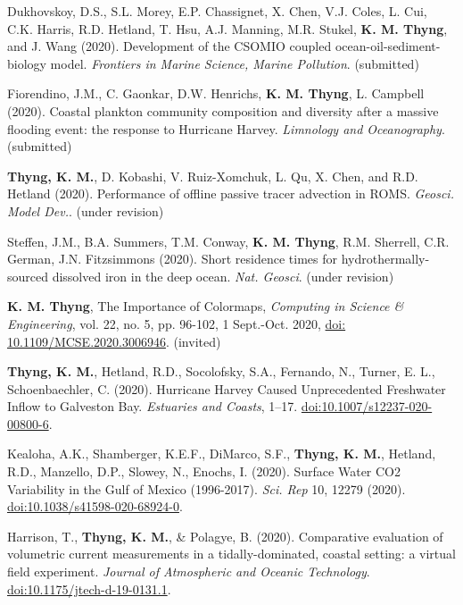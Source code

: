 \documentclass[10pt,letterpaper]{article}
\newcommand{\kmt}{\textbf{K. M. Thyng}}
\newcommand{\tkm}{\textbf{Thyng, K. M.}}
\renewenvironment{itemize}{
  \begin{list}{}{
    \setlength{\leftmargin}{1.5em}
    \setlength{\itemsep}{0.25em}
    \setlength{\parskip}{0pt}
    \setlength{\parsep}{0.25em}
  }
}{
  \end{list}
}
\begin{document}
\begin{itemize}

\item Dukhovskoy, D.S., S.L. Morey, E.P. Chassignet, X. Chen, V.J. Coles, L. Cui, C.K. Harris, R.D. Hetland, T. Hsu, A.J. Manning, M.R. Stukel, \kmt, and J. Wang (2020). Development of the CSOMIO coupled ocean-oil-sediment-biology model. \textit{Frontiers in Marine Science, Marine Pollution}. (submitted)

\item Fiorendino, J.M., C. Gaonkar, D.W. Henrichs, \kmt, L. Campbell (2020). Coastal plankton community composition and diversity after a massive flooding event: the response to Hurricane Harvey. \textit{Limnology and Oceanography}. (submitted)

\item \tkm, D. Kobashi, V. Ruiz-Xomchuk, L. Qu, X. Chen, and R.D. Hetland (2020). Performance of offline passive tracer advection in ROMS. \textit{Geosci. Model Dev.}. (under revision)

\item Steffen, J.M., B.A. Summers, T.M. Conway, \kmt, R.M. Sherrell, C.R. German, J.N. Fitzsimmons (2020). Short residence times for hydrothermally-sourced dissolved iron in the deep ocean. \textit{Nat. Geosci}. (under revision)

\item \kmt, The Importance of Colormaps, \textit{Computing in Science & Engineering}, vol. 22, no. 5, pp. 96-102, 1 Sept.-Oct. 2020, \href{https://doi.org/10.1109/MCSE.2020.3006946}{doi: 10.1109/MCSE.2020.3006946}. (invited)

\item \tkm, Hetland, R.D., Socolofsky, S.A., Fernando, N., Turner, E. L., Schoenbaechler, C. (2020). Hurricane Harvey Caused Unprecedented Freshwater Inflow to Galveston Bay. \textit{Estuaries and Coasts}, 1--17. \href{https://doi.org/10.1007/s12237-020-00800-6}{doi:10.1007/s12237-020-00800-6}.

\item Kealoha, A.K., Shamberger, K.E.F., DiMarco, S.F., \tkm, Hetland, R.D., Manzello, D.P., Slowey, N., Enochs, I. (2020). Surface Water CO2 Variability in the Gulf of Mexico (1996-2017). \textit{Sci. Rep} 10, 12279 (2020). \href{https://doi.org/10.1038/s41598-020-68924-0}{doi:10.1038/s41598-020-68924-0}.

\item Harrison, T., \tkm, & Polagye, B. (2020). Comparative evaluation of volumetric current measurements in a tidally-dominated, coastal setting: a virtual field experiment. \textit{Journal of Atmospheric and Oceanic Technology}.  \href{http://doi.org/10.1175/jtech-d-19-0131.1}{doi:10.1175/jtech-d-19-0131.1}.


\end{itemize}
\end{document}
